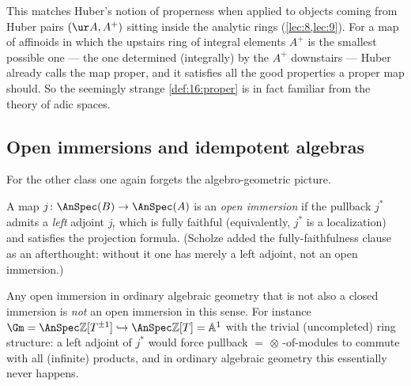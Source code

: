 \begin{remark}
\label{rmk:16:proper-huber}
This matches Huber's notion of properness when applied to objects coming from Huber
pairs $(\ur A,A^+)$ sitting inside the analytic rings (\cref{lec:8,lec:9}). For a map
of affinoids in which the upstairs ring of integral elements $A^+$ is the smallest
possible one --- the one determined (integrally) by the $A^+$ downstairs --- Huber already
calls the map proper, and it satisfies all the good properties a proper map should. So
the seemingly strange \cref{def:16:proper} is in fact familiar from the theory of adic
spaces.
\end{remark}

\subsection{Open immersions and idempotent algebras}
\label{subsec:16:open}

For the other class one again forgets the algebro-geometric picture.

\begin{definition}
\label{def:16:open}
A map $j\colon\AnSpec(B)\to\AnSpec(A)$ is an \emph{open immersion} if the pullback
$j^*$ admits a \emph{left} adjoint $j_!$ which is fully faithful (equivalently,
$j^*$ is a localization) and satisfies the projection formula. (Scholze added the
fully-faithfulness clause as an afterthought: without it one has merely a left
adjoint, not an open immersion.)
\end{definition}

\begin{remark}
\label{rmk:16:open-nonexample}
Any open immersion in ordinary algebraic geometry that is not also a closed immersion
is \emph{not} an open immersion in this sense. For instance
$\Gm=\AnSpec\mathbb{Z}[T^{\pm1}]\hookrightarrow\AnSpec\mathbb{Z}[T]=\mathbb{A}^1$ with
the trivial (uncompleted) ring structure: a left adjoint of $j^*$ would force pullback
$=\,\otimes\,$-of-modules to commute with all (infinite) products, and in ordinary
algebraic geometry this essentially never happens.
\end{remark}


